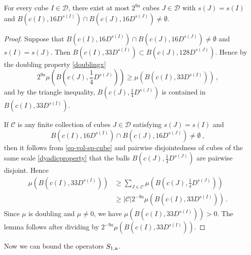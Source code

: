 \begin{lemma}
    \label{boundary-overlap}
    \leanok
    For every cube $I \in \mathcal{D}$, there exist at most $2^{9a}$ cubes $J \in \mathcal{D}$ with $s(J) = s(I)$ and $B(c(I), 16D^{s(I)}) \cap B(c(J), 16 D^{s(J)}) \ne \emptyset$.
\end{lemma}

\begin{proof}
    \leanok
    Suppose that $B(c(I), 16 D^{s(I)}) \cap B(c(J), 16 D^{s(J)}) \ne \emptyset$ and $s(I) = s(J)$. Then $B(c(I), 33 D^{s(I)}) \subset B(c(J), 128 D^{s(J)})$. Hence by the doubling property \eqref{doublingx}
    $$
        2^{9a}\mu(B(c(J), \frac{1}{4}D^{s(J)})) \ge \mu(B(c(I), 33 D^{s(I)}))\,,
    $$
    and by the triangle inequality, $B(c(J), \frac{1}{4}D^{s(J)})$ is contained in $B(c(I), 33 D^{s(I)})$.

    If $\mathcal{C}$ is any finite collection of cubes $J \in \mathcal{D}$ satisfying $s(J) = s(I)$ and
    \begin{equation*}
        B(c(I), 16 D^{s(I)}) \cap B(c(J), 16 D^{s(J)}) \ne\emptyset\ ,
    \end{equation*} then it follows from \eqref{eq-vol-sp-cube} and pairwise disjointedness of cubes of the same scale \eqref{dyadicproperty} that the balls $B(c(J), \frac{1}{4} D^{s(J)})$ are pairwise disjoint. Hence
    \begin{align*}
        \mu(B(c(I), 33 D^{s(I)})) &\ge \sum_{J \in \mathcal{C}} \mu(B(c(J), \frac{1}{4}D^{s(J)}))\\
        &\ge |\mathcal{C}| 2^{-9a} \mu(B(c(I), 33 D^{s(I)}))\,.
    \end{align*}
    Since $\mu$ is doubling and $\mu \ne 0$, we have $\mu(B(c(I), 33D^{s(I)})) > 0$. The lemma follows after dividing by $2^{-9a}\mu(B(c(I), 33D^{s(I)}))$.
\end{proof}

Now we can bound the operators $S_{1, {\mathfrak u}}$.

